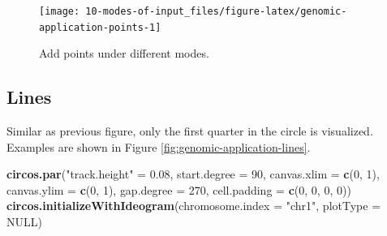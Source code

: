 \documentclass[]{book}
\newenvironment{Shaded}{\begin{snugshade}}{\end{snugshade}}
\newcommand{\KeywordTok}[1]{\textcolor[rgb]{0.13,0.29,0.53}{\textbf{#1}}}
\newcommand{\DataTypeTok}[1]{\textcolor[rgb]{0.13,0.29,0.53}{#1}}
\newcommand{\DecValTok}[1]{\textcolor[rgb]{0.00,0.00,0.81}{#1}}
\newcommand{\FloatTok}[1]{\textcolor[rgb]{0.00,0.00,0.81}{#1}}
\newcommand{\StringTok}[1]{\textcolor[rgb]{0.31,0.60,0.02}{#1}}
\newcommand{\OtherTok}[1]{\textcolor[rgb]{0.56,0.35,0.01}{#1}}
\newcommand{\ControlFlowTok}[1]{\textcolor[rgb]{0.13,0.29,0.53}{\textbf{#1}}}
\newcommand{\OperatorTok}[1]{\textcolor[rgb]{0.81,0.36,0.00}{\textbf{#1}}}
\newcommand{\NormalTok}[1]{#1}
\begin{document}
\begin{Shaded}
\end{Shaded}

\begin{figure}

{\centering \texttt{[image: 10-modes-of-input\_files/figure-latex/genomic-application-points-1]} 

}

\caption{Add points under different modes.}\label{fig:genomic-application-points}
\end{figure}

\subsection{Lines}\label{modes-lines}

Similar as previous figure, only the first quarter in the circle is
visualized. Examples are shown in Figure
\ref{fig:genomic-application-lines}.

\begin{Shaded}
\begin{Highlighting}[]
\KeywordTok{circos.par}\NormalTok{(}\StringTok{"track.height"}\NormalTok{ =}\StringTok{ }\FloatTok{0.08}\NormalTok{, }\DataTypeTok{start.degree =} \DecValTok{90}\NormalTok{,}
    \DataTypeTok{canvas.xlim =} \KeywordTok{c}\NormalTok{(}\DecValTok{0}\NormalTok{, }\DecValTok{1}\NormalTok{), }\DataTypeTok{canvas.ylim =} \KeywordTok{c}\NormalTok{(}\DecValTok{0}\NormalTok{, }\DecValTok{1}\NormalTok{), }\DataTypeTok{gap.degree =} \DecValTok{270}\NormalTok{,}
    \DataTypeTok{cell.padding =} \KeywordTok{c}\NormalTok{(}\DecValTok{0}\NormalTok{, }\DecValTok{0}\NormalTok{, }\DecValTok{0}\NormalTok{, }\DecValTok{0}\NormalTok{))}
\KeywordTok{circos.initializeWithIdeogram}\NormalTok{(}\DataTypeTok{chromosome.index =} \StringTok{"chr1"}\NormalTok{, }\DataTypeTok{plotType =} \OtherTok{NULL}\NormalTok{)}
\end{Highlighting}
\end{Shaded}
\end{document}
